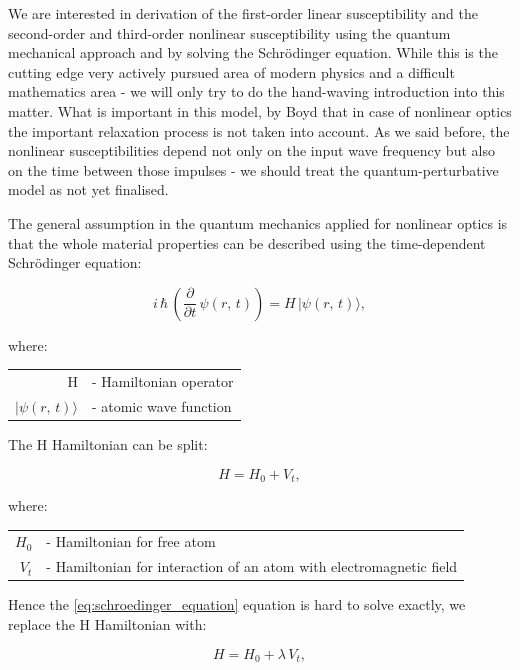 \documentclass[12pt,twoside,a4paper]{article}
\numberwithin{equation}{subsection}
\numberwithin{figure}{subsection}
\newcommand{\ket}[1]{|#1\rangle}
\begin{document}
We are interested in derivation of the first-order linear susceptibility and the second-order and third-order nonlinear
susceptibility using the quantum mechanical approach and by solving the Schrödinger equation. While this is the cutting edge very
actively pursued area of modern physics and a difficult mathematics area - we will only try to do the hand-waving introduction into
this matter. What is important in this model, by Boyd \cite{boyd_nlo} that in case of nonlinear optics the important relaxation
process is not taken into account. As we said before, the nonlinear susceptibilities depend not only on the input wave
frequency but also on the time between those impulses - we should treat the quantum-perturbative model as not yet finalised.


The general assumption in the quantum mechanics applied for nonlinear optics is that the whole material properties can be described
using the time-dependent Schrödinger equation:

\begin{equation} \label{eq:schroedinger_equation}
  i\,\hbar\,({\frac {\partial }{\partial t}}\,\psi (r, \,t))=H\, \ket{ \psi(r, \,t) },
\end{equation}

where: 

\begin{tabular}{ r l}
  H & - Hamiltonian operator \\
  $\ket{\psi(r,\,t)}$ & - atomic wave function \\
\end{tabular}


The H Hamiltonian can be split:

\begin{equation} \label{eq:schroedinger_hamiltonian}
  H={H_{0}} + {V_{t}},
\end{equation}

where:

\begin{tabular} {r l}
  ${H_{0}}$ & - Hamiltonian for free atom \\
  ${V_{t}}$ & - Hamiltonian for interaction of an atom with electromagnetic field \\
\end{tabular}


Hence the \ref{eq:schroedinger_equation} equation is hard to solve exactly, we replace the H Hamiltonian with:

\begin{equation} \label{eq:shamiltionian_replaced}
  H = {H_{0}} + \lambda \,{V_{t}},
\end{equation}
\end{document}
